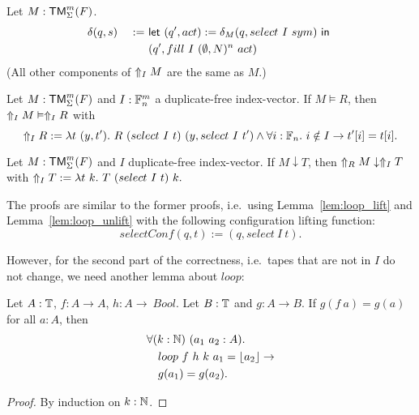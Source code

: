 \begin{definition}[$\LiftTapes{M}{I}$]
  \label{def:LiftTapes}
  Let $M:\TM_\Sigma^m(F)$.
  \begin{alignat*}{2}
    &\delta(q,s) &~:=~& \Let{(q', act) := \delta_M(q, select~I~sym)}{\\%
    &            &~  ~& (q', fill~I~(\None,N)^n~act)}
  \end{alignat*}
  (All other components of $\LiftTapes{M}{I}$ are the same as $M$.)
\end{definition}

\begin{lemma}
  \label{lem:LiftTapes_Realise}
  Let $M : \TM_\Sigma^m(F)$ and $I : \Fin_n^m$ a duplicate-free index-vector.  If $M \vDash R$, then $\LiftTapes{M}{I} \vDash \LiftTapes{R}{I}$ with
  \[
    \LiftTapes{R}{I} := \lambda t~(y,t').~ R~(select~I~t)~(y, select~I~t') \land \forall i:\Fin_n.~i \notin I \rightarrow t'[i]=t[i].
  \]
\end{lemma}

\begin{lemma}
  \label{lem:LiftTapes_TerminatesIn}
  Let $M : \TM_\Sigma^m(F)$ and $I$ duplicate-free index-vector. If $M \downarrow T$, then $\LiftTapes{M}{R} \downarrow \LiftTapes{T}{I}$ with
  $
    \LiftTapes{T}{I} := \lambda t~k.~ T~(select~I~t)~k.
  $
\end{lemma}

The proofs are similar to the former proofs, i.e.\ using Lemma~\ref{lem:loop_lift} and Lemma~\ref{lem:loop_unlift} with the following configuration
lifting function:
\[
  selectConf(q,t) := (q, select~I~t).
\]

However, for the second part of the correctness, i.e.\ tapes that are not in $I$ do not change, we need another lemma about $loop$:

\begin{lemma}
  \label{lem:loop_map}
  Let $A:\Type$, $f:A \to A$, $h:A \to\ Bool$.  Let $B:\Type$ and $g : A \to B$.  If $g(f~a)=g(a)$ for all $a:A$, then
  \begin{alignat*}{1}
    & \forall (k:\Nat)~(a_1~a_2 : A). \\
    & \quad loop~f~h~k~a_1 = \Some{a_2} \rightarrow \\
    & \quad g(a_1) = g(a_2).
  \end{alignat*}
\end{lemma}
\begin{proof}
  By induction on $k:\Nat$.
\end{proof}

